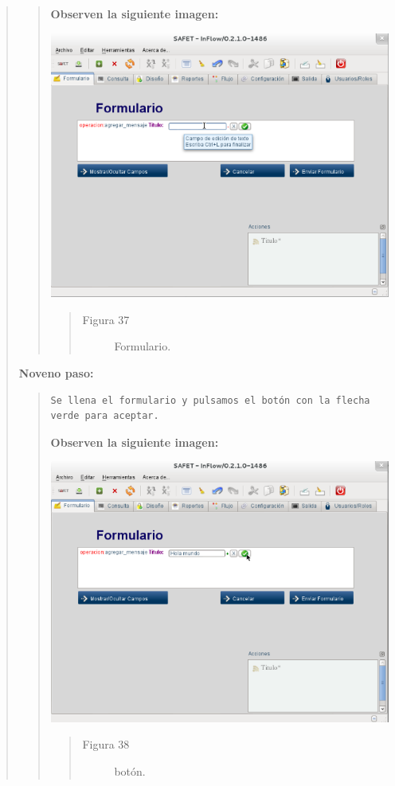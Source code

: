 \documentclass[letterpaper,11pt,spanish]{sphinxmanual}
\begin{document}
\begin{quote}
\begin{quote}
\textbf{Observen la siguiente imagen:}

\includegraphics{inflow12.png}
\begin{quote}\begin{description}
\item[{Figura 37}] \leavevmode
Formulario.

\end{description}\end{quote}
\end{quote}

\textbf{Noveno paso:}
\begin{quote}

\begin{Verbatim}[commandchars=\\\{\}]
Se llena el formulario y pulsamos el botón con la flecha verde para aceptar.
\end{Verbatim}

\textbf{Observen la siguiente imagen:}

\includegraphics{inflow13.png}
\begin{quote}\begin{description}
\item[{Figura 38}] \leavevmode
botón.


\end{description}
\end{quote}
\end{quote}
\end{quote}
\end{document}
